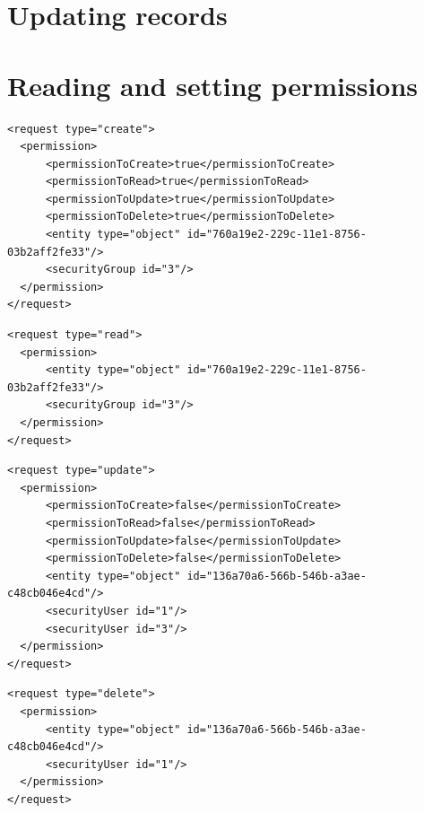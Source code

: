 \section{Updating records}




\section{Reading and setting permissions}




\begin{lstlisting}
<request type="create">
  <permission>
      <permissionToCreate>true</permissionToCreate>  
      <permissionToRead>true</permissionToRead>
      <permissionToUpdate>true</permissionToUpdate>
      <permissionToDelete>true</permissionToDelete>
      <entity type="object" id="760a19e2-229c-11e1-8756-03b2aff2fe33"/>
      <securityGroup id="3"/>
  </permission>
</request>
\end{lstlisting}


\begin{lstlisting}
<request type="read">
  <permission>
      <entity type="object" id="760a19e2-229c-11e1-8756-03b2aff2fe33"/>
      <securityGroup id="3"/>
  </permission>
</request>
\end{lstlisting}


\begin{lstlisting}
<request type="update">
  <permission>
      <permissionToCreate>false</permissionToCreate>  
      <permissionToRead>false</permissionToRead>
      <permissionToUpdate>false</permissionToUpdate>
      <permissionToDelete>false</permissionToDelete>
      <entity type="object" id="136a70a6-566b-546b-a3ae-c48cb046e4cd"/>
      <securityUser id="1"/>
      <securityUser id="3"/>
  </permission>
</request>
\end{lstlisting}


\begin{lstlisting}
<request type="delete">
  <permission>
      <entity type="object" id="136a70a6-566b-546b-a3ae-c48cb046e4cd"/>
      <securityUser id="1"/>
  </permission>
</request>
\end{lstlisting}



